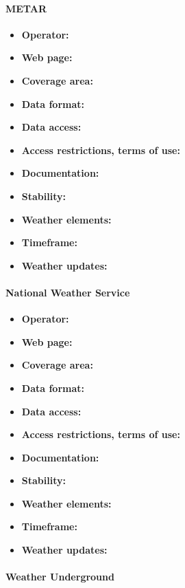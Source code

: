 \paragraph{METAR}

\begin{itemize}
  \item \textbf{Operator:}
  \item \textbf{Web page:}
  \item \textbf{Coverage area:}
  \item \textbf{Data format:}
  \item \textbf{Data access:}
  \item \textbf{Access restrictions, terms of use:}
  \item \textbf{Documentation:}
  \item \textbf{Stability:}
  \item \textbf{Weather elements:}
  \item \textbf{Timeframe:}
  \item \textbf{Weather updates:}
\end{itemize}

\paragraph{National Weather Service}

\begin{itemize}
  \item \textbf{Operator:}
  \item \textbf{Web page:}
  \item \textbf{Coverage area:}
  \item \textbf{Data format:}
  \item \textbf{Data access:}
  \item \textbf{Access restrictions, terms of use:}
  \item \textbf{Documentation:}
  \item \textbf{Stability:}
  \item \textbf{Weather elements:}
  \item \textbf{Timeframe:}
  \item \textbf{Weather updates:}
\end{itemize}

\paragraph{Weather Underground}

